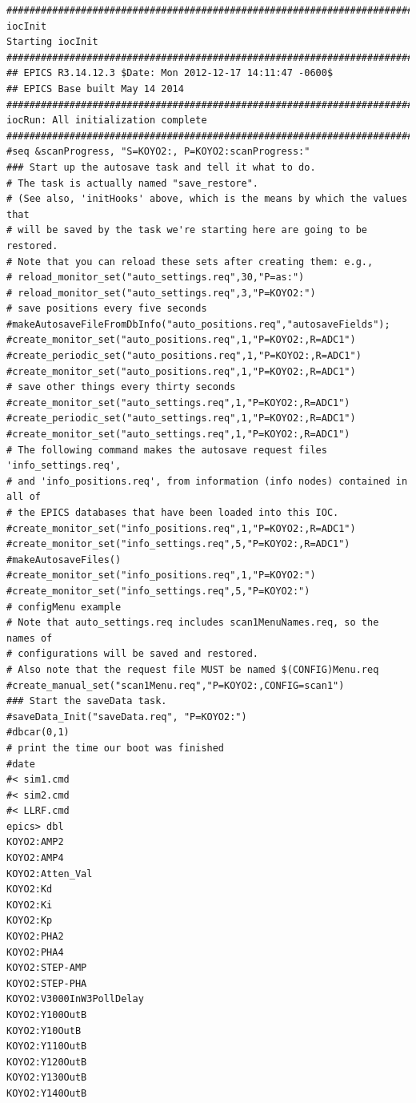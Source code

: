 \documentclass[11pt
  , a4paper
  , article
  , oneside
]{memoir}
\begin{document}
\begin{lstlisting}[style=termstyle]
###############################################################################
iocInit
Starting iocInit
############################################################################
## EPICS R3.14.12.3 $Date: Mon 2012-12-17 14:11:47 -0600$
## EPICS Base built May 14 2014
############################################################################
iocRun: All initialization complete
###############################################################################
#seq &scanProgress, "S=KOYO2:, P=KOYO2:scanProgress:"
### Start up the autosave task and tell it what to do.
# The task is actually named "save_restore".
# (See also, 'initHooks' above, which is the means by which the values that
# will be saved by the task we're starting here are going to be restored.
# Note that you can reload these sets after creating them: e.g., 
# reload_monitor_set("auto_settings.req",30,"P=as:")
# reload_monitor_set("auto_settings.req",3,"P=KOYO2:")
# save positions every five seconds
#makeAutosaveFileFromDbInfo("auto_positions.req","autosaveFields");
#create_monitor_set("auto_positions.req",1,"P=KOYO2:,R=ADC1")
#create_periodic_set("auto_positions.req",1,"P=KOYO2:,R=ADC1")
#create_monitor_set("auto_positions.req",1,"P=KOYO2:,R=ADC1")
# save other things every thirty seconds
#create_monitor_set("auto_settings.req",1,"P=KOYO2:,R=ADC1")
#create_periodic_set("auto_settings.req",1,"P=KOYO2:,R=ADC1")
#create_monitor_set("auto_settings.req",1,"P=KOYO2:,R=ADC1")
# The following command makes the autosave request files 'info_settings.req',
# and 'info_positions.req', from information (info nodes) contained in all of
# the EPICS databases that have been loaded into this IOC.
#create_monitor_set("info_positions.req",1,"P=KOYO2:,R=ADC1")
#create_monitor_set("info_settings.req",5,"P=KOYO2:,R=ADC1")
#makeAutosaveFiles()
#create_monitor_set("info_positions.req",1,"P=KOYO2:")
#create_monitor_set("info_settings.req",5,"P=KOYO2:")
# configMenu example
# Note that auto_settings.req includes scan1MenuNames.req, so the names of
# configurations will be saved and restored.  
# Also note that the request file MUST be named $(CONFIG)Menu.req
#create_manual_set("scan1Menu.req","P=KOYO2:,CONFIG=scan1")
### Start the saveData task.
#saveData_Init("saveData.req", "P=KOYO2:")
#dbcar(0,1)
# print the time our boot was finished
#date
#< sim1.cmd
#< sim2.cmd
#< LLRF.cmd
epics> dbl
KOYO2:AMP2
KOYO2:AMP4
KOYO2:Atten_Val
KOYO2:Kd
KOYO2:Ki
KOYO2:Kp
KOYO2:PHA2
KOYO2:PHA4
KOYO2:STEP-AMP
KOYO2:STEP-PHA
KOYO2:V3000InW3PollDelay
KOYO2:Y100OutB
KOYO2:Y10OutB
KOYO2:Y110OutB
KOYO2:Y120OutB
KOYO2:Y130OutB
KOYO2:Y140OutB

\end{lstlisting}
\end{document}
